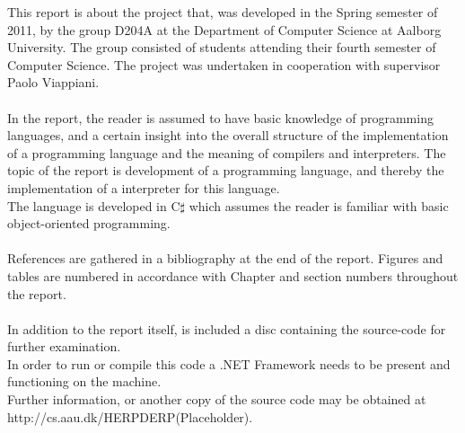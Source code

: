 This report is about the project that, was developed in the Spring semester of 2011, by the group D204A at the Department of Computer Science at Aalborg University. The group consisted of students attending their fourth semester of Computer Science. The project was undertaken in cooperation with supervisor Paolo Viappiani. \\
\\
In the report, the reader is assumed to have basic knowledge of programming languages, and a certain insight into the overall structure of the implementation of a programming language and the meaning of compilers and interpreters. The topic of the report is development of a programming language, and thereby the implementation of a interpreter for this language. \\
The language is developed in C$\sharp$ which assumes the reader is familiar with basic object-oriented programming. \\
\\
References are gathered in a bibliography at the end of the report. Figures and tables are numbered in accordance with Chapter and section numbers throughout the report. \\
\\
In addition to the report itself, is included a disc containing the source-code for further examination. \\
In order to run or compile this code a .NET Framework needs to be present and functioning on the machine. \\
Further information, or another copy of the source code may be obtained at http://cs.aau.dk/HERPDERP(Placeholder).

\newpage\mbox{}\newpage